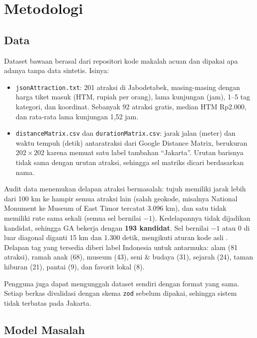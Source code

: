 \section{Metodologi}

\subsection{Data}
\label{sec:data}

Dataset bawaan berasal dari repositori kode makalah acuan \cite{qomariyah2021, repo} dan dipakai apa adanya tanpa data sintetis. Isinya:
\begin{itemize}
  \item \texttt{jsonAttraction.txt}: 201 atraksi di Jabodetabek, masing-masing dengan harga tiket masuk (HTM, rupiah per orang), lama kunjungan (jam), 1--5 tag kategori, dan koordinat. Sebanyak 92 atraksi gratis, median HTM Rp2.000, dan rata-rata lama kunjungan 1,52 jam.
  \item \texttt{distanceMatrix.csv} dan \texttt{durationMatrix.csv}: jarak jalan (meter) dan waktu tempuh (detik) antaratraksi dari Google Distance Matrix, berukuran $202 \times 202$ karena memuat satu label tambahan ``Jakarta''. Urutan barisnya tidak sama dengan urutan atraksi, sehingga sel matriks dicari berdasarkan nama.
\end{itemize}

Audit data menemukan delapan atraksi bermasalah: tujuh memiliki jarak lebih dari 100 km ke hampir semua atraksi lain (salah geokode, misalnya National Monument ke Museum of East Timor tercatat 3.096 km), dan satu tidak memiliki rute sama sekali (semua sel bernilai $-1$). Kedelapannya tidak dijadikan kandidat, sehingga GA bekerja dengan \textbf{193 kandidat}. Sel bernilai $-1$ atau 0 di luar diagonal diganti 15 km dan 1.300 detik, mengikuti aturan kode asli \cite{repo}. Delapan tag yang tersedia diberi label Indonesia untuk antarmuka: alam (81 atraksi), ramah anak (68), museum (43), seni \& budaya (31), sejarah (24), taman hiburan (21), pantai (9), dan favorit lokal (8).

Pengguna juga dapat mengunggah dataset sendiri dengan format yang sama. Setiap berkas divalidasi dengan skema \texttt{zod} sebelum dipakai, sehingga sistem tidak terbatas pada Jakarta.

\subsection{Model Masalah}
\label{sec:model}

